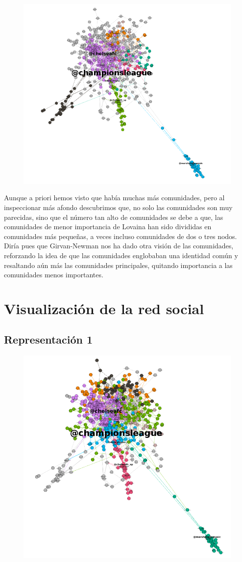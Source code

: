 \begin{figure}[H]
	\centering
	\includegraphics[width=0.7\linewidth]{Imagenes/screenshot016}
\end{figure}
Aunque a priori hemos visto que había muchas más comunidades, pero al inspeccionar más afondo descubrimos que, no solo las comunidades son muy parecidas, sino que el número tan alto de comunidades se debe a que, las comunidades de menor importancia de Lovaina han sido divididas en comunidades más pequeñas, a veces incluso comunidades de dos o tres nodos. Diría pues que Girvan-Newman nos ha dado otra visión de las comunidades, reforzando la idea de que las comunidades englobaban una identidad común y resaltando aún más las comunidades principales, quitando importancia a las comunidades menos importantes.
\newpage
\section{Visualización de la red social}
\subsection{Representación 1}


\begin{figure}[H]
	\centering
	\includegraphics[width=0.75\linewidth]{Imagenes/screenshot023}
\end{figure}


